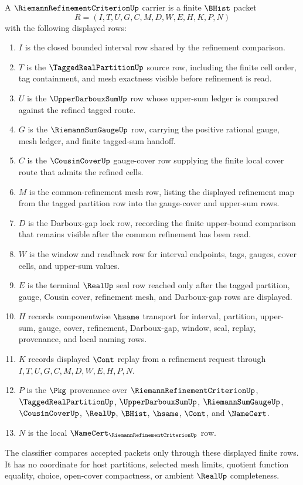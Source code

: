 \begin{definition}
\label{def:riemann-refinement-criterion-carrier}
A $\RiemannRefinementCriterionUp$ carrier is a finite $\BHist$ packet
$$
R=(I,T,U,G,C,M,D,W,E,H,K,P,N)
$$
with the following displayed rows:
\begin{enumerate}
\item $I$ is the closed bounded interval row shared by the refinement comparison.
\item $T$ is the $\TaggedRealPartitionUp$ source row, including the finite cell order, tag containment, and mesh exactness visible before refinement is read.
\item $U$ is the $\UpperDarbouxSumUp$ row whose upper-sum ledger is compared against the refined tagged route.
\item $G$ is the $\RiemannSumGaugeUp$ row, carrying the positive rational gauge, mesh ledger, and finite tagged-sum handoff.
\item $C$ is the $\CousinCoverUp$ gauge-cover row supplying the finite local cover route that admits the refined cells.
\item $M$ is the common-refinement mesh row, listing the displayed refinement map from the tagged partition row into the gauge-cover and upper-sum rows.
\item $D$ is the Darboux-gap lock row, recording the finite upper-bound comparison that remains visible after the common refinement has been read.
\item $W$ is the window and readback row for interval endpoints, tags, gauges, cover cells, and upper-sum values.
\item $E$ is the terminal $\RealUp$ seal row reached only after the tagged partition, gauge, Cousin cover, refinement mesh, and Darboux-gap rows are displayed.
\item $H$ records componentwise $\hsame$ transport for interval, partition, upper-sum, gauge, cover, refinement, Darboux-gap, window, seal, replay, provenance, and local naming rows.
\item $K$ records displayed $\Cont$ replay from a refinement request through $I,T,U,G,C,M,D,W,E,H,P,N$.
\item $P$ is the $\Pkg$ provenance over $\RiemannRefinementCriterionUp$, $\TaggedRealPartitionUp$, $\UpperDarbouxSumUp$, $\RiemannSumGaugeUp$, $\CousinCoverUp$, $\RealUp$, $\BHist$, $\hsame$, $\Cont$, and $\NameCert$.
\item $N$ is the local $\NameCert_{\RiemannRefinementCriterionUp}$ row.
\end{enumerate}
The classifier compares accepted packets only through these displayed finite rows. It has no coordinate for host partitions, selected mesh limits, quotient function equality, choice, open-cover compactness, or ambient $\RealUp$ completeness.
\end{definition}


